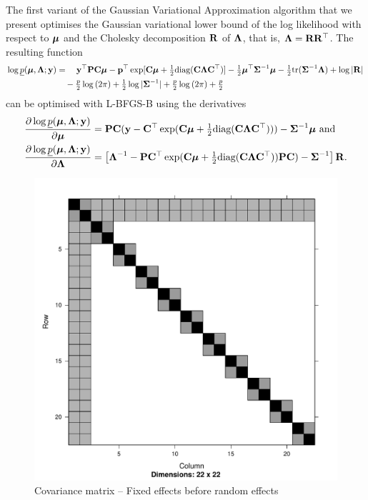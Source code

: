 \documentclass{amsart}[12pt]
\begin{document}
	The first variant of the Gaussian Variational Approximation algorithm that we present optimises the
	Gaussian variational lower bound of the log likelihood with respect to ${\boldsymbol \mu}$ and the Cholesky decomposition
	${\bf R}$ of   ${\boldsymbol \Lambda}$, that is, ${\boldsymbol \Lambda} = {\bf R} {\bf R}^\top$. The resulting function
	\begin{align*}
		\log \underline{p}({\boldsymbol \mu}, {\boldsymbol \Lambda}; {\bf y}) & = \quad {\bf y}^\top{\bf P} {\bf C} {\boldsymbol\mu} - {\bf p}^\top \exp[{\bf C} {\boldsymbol \mu} + \tfrac{1}{2} \text{diag}({\bf C} {\boldsymbol \Lambda} {\bf C}^\top)] - \tfrac{1}{2} {\boldsymbol \mu}^\top {\boldsymbol\Sigma}^{-1} {\boldsymbol \mu} - \tfrac{1}{2} \text{tr}{({\boldsymbol\Sigma}^{-1} {\boldsymbol\Lambda})} + \log{|{\bf R}|} \\
		                                        & \quad - \tfrac{p}{2} \log{(2 \pi)} + \tfrac{1}{2} \log{|{\boldsymbol\Sigma}^{-1}|} + \tfrac{p}{2} \log{(2 \pi)} + \tfrac{p}{2}                                                                              
	\end{align*}
	can be optimised with L-BFGS-B using the derivatives
	\begin{align*}
		\frac{\partial \log \underline{p}({\boldsymbol \mu}, {\boldsymbol \Lambda}; {\bf y})}{\partial {\boldsymbol\mu}}     & = {\bf P} {\bf C} ({\bf y} - {\bf C}^\top \exp({\bf C} {\boldsymbol \mu} + \tfrac{1}{2} \text{diag}{({\bf C}{\boldsymbol\Lambda}{\bf C}^\top)})) - {\boldsymbol \Sigma}^{-1} {\boldsymbol \mu} \text{ and}                \\
		\frac{\partial \log \underline{p}({\boldsymbol \mu}, {\boldsymbol \Lambda}; {\bf y})}{\partial {\boldsymbol\Lambda}} & = \left [{\boldsymbol \Lambda}^{-1} - {\bf P} {\bf C}^\top \exp({\bf C} {\boldsymbol \mu} + \tfrac{1}{2} \text{diag}({\bf C} {\boldsymbol \Lambda} {\bf C}^\top)) {\bf P} {\bf C}) - {\boldsymbol \Sigma}^{-1} \right ] {\bf R}. 
	\end{align*}

	\begin{figure}[p]
		\caption{\tiny Covariance matrix -- Fixed effects before random effects}
		\label{fig:covfixedrandom}
		\includegraphics[scale=.25]{mX_mZ_mLambda.pdf}
	\end{figure}
	
\end{document}
